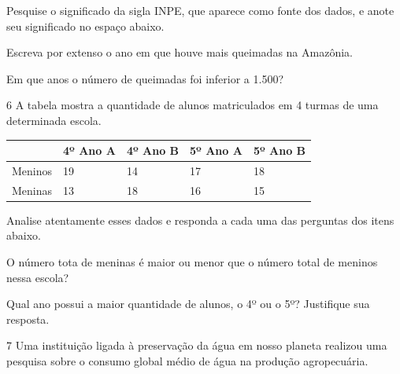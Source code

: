 \begin{escolha}
\item
  Pesquise o significado da sigla INPE, que aparece como fonte dos dados,
  e anote seu significado no espaço abaixo.


\item
  Escreva por extenso o ano em que houve mais queimadas na Amazônia.


\item
  Em que anos o número de queimadas foi inferior a 1.500?

\end{escolha}


\num{6} A tabela mostra a quantidade de alunos matriculados em 4 turmas de
uma determinada escola.

\begin{longtable}[]{@{}lllll@{}}
\toprule
& 4º Ano A & 4º Ano B & 5º Ano A & 5º Ano B\tabularnewline
\midrule
\endhead
Meninos & 19 & 14 & 17 & 18\tabularnewline
Meninas & 13 & 18 & 16 & 15\tabularnewline
\bottomrule
\end{longtable}

Analise atentamente esses dados e responda a cada uma das perguntas dos
itens abaixo.

\begin{escolha}
\item
  O número tota de meninas é maior ou menor que o número total de
  meninos nessa escola?


\item
  Qual ano possui a maior quantidade de alunos, o 4º ou o 5º? Justifique
  sua resposta.

\end{escolha}


\num{7} Uma instituição ligada à preservação da água em nosso planeta
realizou uma pesquisa sobre o consumo global médio de água na produção
agropecuária.

